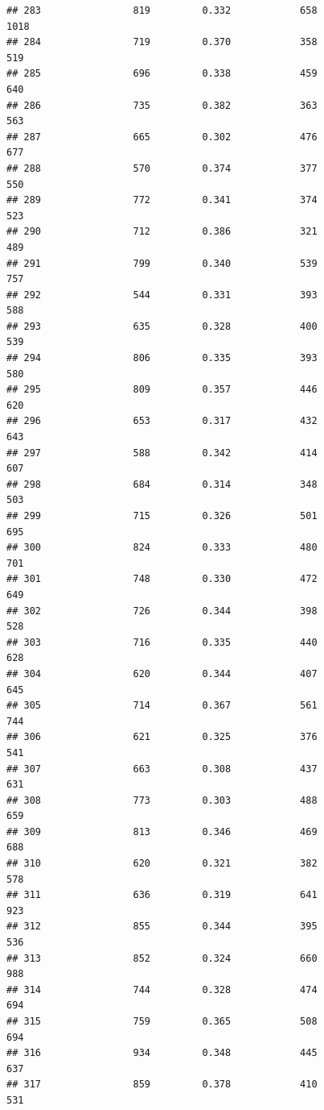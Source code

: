 \documentclass[]{book}
\begin{document}
\begin{verbatim}
## 283                819         0.332            658                1018
## 284                719         0.370            358                 519
## 285                696         0.338            459                 640
## 286                735         0.382            363                 563
## 287                665         0.302            476                 677
## 288                570         0.374            377                 550
## 289                772         0.341            374                 523
## 290                712         0.386            321                 489
## 291                799         0.340            539                 757
## 292                544         0.331            393                 588
## 293                635         0.328            400                 539
## 294                806         0.335            393                 580
## 295                809         0.357            446                 620
## 296                653         0.317            432                 643
## 297                588         0.342            414                 607
## 298                684         0.314            348                 503
## 299                715         0.326            501                 695
## 300                824         0.333            480                 701
## 301                748         0.330            472                 649
## 302                726         0.344            398                 528
## 303                716         0.335            440                 628
## 304                620         0.344            407                 645
## 305                714         0.367            561                 744
## 306                621         0.325            376                 541
## 307                663         0.308            437                 631
## 308                773         0.303            488                 659
## 309                813         0.346            469                 688
## 310                620         0.321            382                 578
## 311                636         0.319            641                 923
## 312                855         0.344            395                 536
## 313                852         0.324            660                 988
## 314                744         0.328            474                 694
## 315                759         0.365            508                 694
## 316                934         0.348            445                 637
## 317                859         0.378            410                 531

\end{verbatim}
\end{document}
